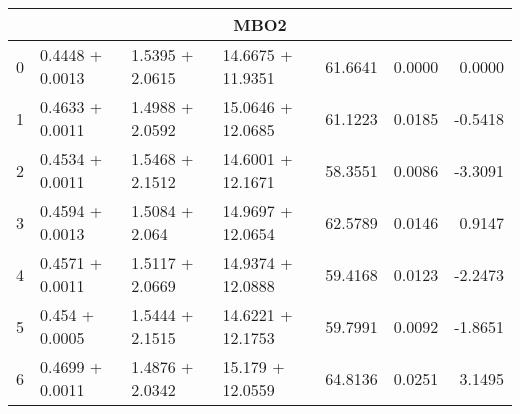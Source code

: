 \begin{tabular}{llllrrr}
  \midrule
  \multicolumn{7}{c}{MBO2} \\
  \midrule
  0 &  0.4448 + 0.0013 &  1.5395 + 2.0615 &  14.6675 + 11.9351 &             61.6641 &                 0.0000 &         0.0000 \\
  1 &  0.4633 + 0.0011 &  1.4988 + 2.0592 &  15.0646 + 12.0685 &             61.1223 &                 0.0185 &        -0.5418 \\
  2 &  0.4534 + 0.0011 &  1.5468 + 2.1512 &  14.6001 + 12.1671 &             58.3551 &                 0.0086 &        -3.3091 \\
  3 &  0.4594 + 0.0013 &   1.5084 + 2.064 &  14.9697 + 12.0654 &             62.5789 &                 0.0146 &         0.9147 \\
  4 &  0.4571 + 0.0011 &  1.5117 + 2.0669 &  14.9374 + 12.0888 &             59.4168 &                 0.0123 &        -2.2473 \\
  5 &   0.454 + 0.0005 &  1.5444 + 2.1515 &  14.6221 + 12.1753 &             59.7991 &                 0.0092 &        -1.8651 \\
  6 &  0.4699 + 0.0011 &  1.4876 + 2.0342 &   15.179 + 12.0559 &             64.8136 &                 0.0251 &         3.1495 \\
  \bottomrule
  \end{tabular}
  
